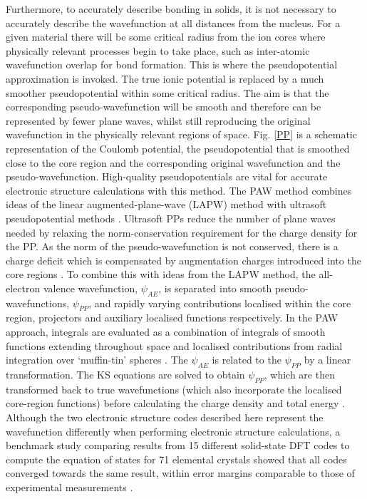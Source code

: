 \documentclass[11pt, twoside]{report}
\begin{document}
Furthermore, to accurately describe bonding in solids, it is not necessary to accurately describe the wavefunction at all distances from the nucleus. For a given material there will be some critical radius from the ion cores where physically relevant processes begin to take place, such as inter-atomic wavefunction overlap for bond formation. This is where the pseudopotential approximation is invoked. The true ionic potential is replaced by a much smoother pseudopotential within some critical radius. The aim is that the corresponding pseudo-wavefunction will be smooth and therefore can be represented by fewer plane waves, whilst still reproducing the original wavefunction in the physically relevant regions of space. Fig. \ref{PP} is a schematic representation of the Coulomb potential, the pseudopotential that is smoothed close to the core region and the corresponding original wavefunction and the pseudo-wavefunction. High-quality pseudopotentials are vital for accurate electronic structure calculations with this method. 
The PAW method combines ideas of the linear augmented-plane-wave (LAPW) method \cite{LAPW} with ultrasoft pseudopotential methods \cite{ultrasoft_PP, ultrasoft_PP_VASP, VASP_wiki_PAW}. Ultrasoft PPs reduce the number of plane waves needed by relaxing the norm-conservation requirement for the charge density for the PP. As the norm of the pseudo-wavefunction is not conserved, there is a charge deficit which is compensated by augmentation charges introduced into the core regions \cite{Prasad_ch5}. To combine this with ideas from the LAPW method, the all-electron valence wavefunction, $\psi_{AE}$, is separated into smooth pseudo-wavefunctions, $\psi_{PP}$, and rapidly varying contributions localised within the core region, projectors and auxiliary localised functions respectively. In the PAW approach, integrals are evaluated as a combination of integrals of smooth functions extending throughout space and localised contributions from radial integration over `muffin-tin' spheres \cite{RichardMartin_Ch11}. The $\psi_{AE}$ is related to the $\psi_{PP}$ by a linear transformation. The KS equations are solved to obtain $\psi_{PP}$, which are then transformed back to true wavefunctions (which also incorporate the localised core-region functions) before calculating the charge density and total energy \cite{Prasad_ch5}.
Although the two electronic structure codes described here represent the wavefunction differently when performing electronic structure calculations, a benchmark study comparing results from 15 different solid-state DFT codes to compute the equation of states for 71 elemental crystals showed that all codes converged towards the same result, within error margins comparable to those of experimental measurements \cite{delta_project}. 
\end{document}
